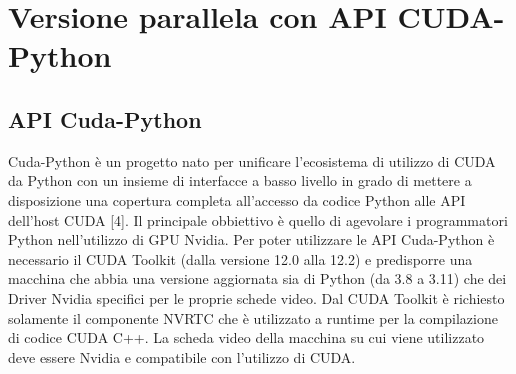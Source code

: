 \documentclass[12pt,a4paper]{report}
\begin{document}
\chapter{Versione parallela con API CUDA-Python} 

\section{API Cuda-Python}
Cuda-Python è un progetto nato per unificare l'ecosistema di utilizzo di CUDA da Python con un insieme di interfacce a basso livello in grado di mettere a disposizione una copertura completa all'accesso da codice Python alle API dell'host CUDA [4]. Il principale obbiettivo è quello di agevolare i programmatori Python nell'utilizzo di GPU Nvidia. \newline \newline
Per poter utilizzare le API Cuda-Python è necessario il CUDA Toolkit (dalla versione 12.0 alla 12.2) e predisporre una macchina che abbia una versione aggiornata sia di Python (da 3.8 a 3.11) che dei Driver Nvidia specifici per le proprie schede video. \newline
Dal CUDA Toolkit è richiesto solamente il componente NVRTC che è utilizzato a runtime per la compilazione di codice CUDA C++. \newline
La scheda video della macchina su cui viene utilizzato deve essere Nvidia e compatibile con l'utilizzo di CUDA.
\end{document}
